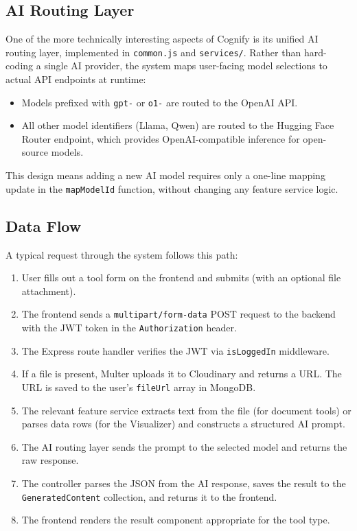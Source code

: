 \documentclass[12pt,a4paper]{article}
\begin{document}
\subsection{AI Routing Layer}

One of the more technically interesting aspects of Cognify is its unified AI routing layer, implemented in \texttt{common.js} and \texttt{services/}. Rather than hard-coding a single AI provider, the system maps user-facing model selections to actual API endpoints at runtime:

\begin{itemize}
    \item Models prefixed with \texttt{gpt-} or \texttt{o1-} are routed to the OpenAI API.
    \item All other model identifiers (Llama, Qwen) are routed to the Hugging Face Router endpoint, which provides OpenAI-compatible inference for open-source models.
\end{itemize}

This design means adding a new AI model requires only a one-line mapping update in the \texttt{mapModelId} function, without changing any feature service logic.

\subsection{Data Flow}

A typical request through the system follows this path:

\begin{enumerate}
    \item User fills out a tool form on the frontend and submits (with an optional file attachment).
    \item The frontend sends a \texttt{multipart/form-data} POST request to the backend with the JWT token in the \texttt{Authorization} header.
    \item The Express route handler verifies the JWT via \texttt{isLoggedIn} middleware.
    \item If a file is present, Multer uploads it to Cloudinary and returns a URL. The URL is saved to the user's \texttt{fileUrl} array in MongoDB.
    \item The relevant feature service extracts text from the file (for document tools) or parses data rows (for the Visualizer) and constructs a structured AI prompt.
    \item The AI routing layer sends the prompt to the selected model and returns the raw response.
    \item The controller parses the JSON from the AI response, saves the result to the \texttt{GeneratedContent} collection, and returns it to the frontend.
    \item The frontend renders the result component appropriate for the tool type.
\end{enumerate}
\end{document}

